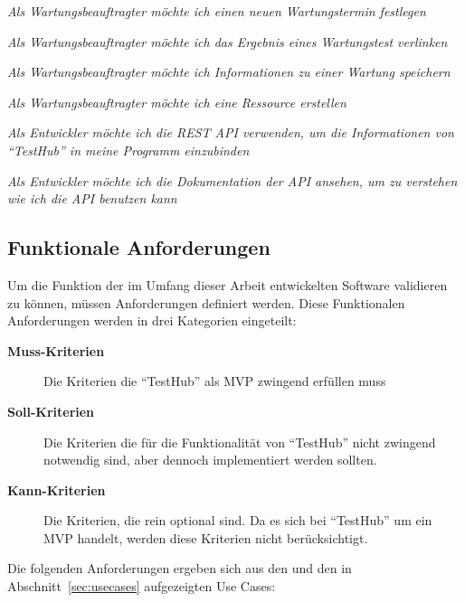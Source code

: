 \begin{description}
    \textit{Als Wartungsbeauftragter möchte ich einen neuen Wartungstermin festlegen}

    \textit{Als Wartungsbeauftragter möchte ich das Ergebnis eines Wartungstest verlinken}

    \textit{Als Wartungsbeauftragter möchte ich Informationen zu einer Wartung speichern}

    \textit{Als Wartungsbeauftragter möchte ich eine Ressource erstellen}

    \textit{Als Entwickler möchte ich die REST API verwenden, um die
    Informationen von ``TestHub'' in meine Programm einzubinden}

    \textit{Als Entwickler möchte ich die Dokumentation
    der API ansehen, um zu verstehen wie ich die API benutzen kann}

\end{description}

\subsection{Funktionale Anforderungen}\label{sec:fas}
Um die Funktion der im Umfang dieser Arbeit entwickelten Software validieren zu
können, müssen Anforderungen definiert werden. Diese Funktionalen Anforderungen
werden in drei Kategorien eingeteilt:

\begin{description}
    \item[\textbf{Muss-Kriterien}]Die Kriterien die ``TestHub'' als \gls{MVP} zwingend erfüllen muss

    \item[\textbf{Soll-Kriterien}]Die Kriterien die für die Funktionalität von ``TestHub''
    nicht zwingend notwendig sind, aber dennoch implementiert werden sollten.

    \item[\textbf{Kann-Kriterien}]Die Kriterien, die rein optional sind. Da es sich
    bei ``TestHub'' um ein \gls{MVP} handelt, werden diese Kriterien nicht berücksichtigt.

\end{description}

Die folgenden Anforderungen ergeben sich aus den  und den
in Abschnitt~\ref{sec:usecases} aufgezeigten Use Cases:

